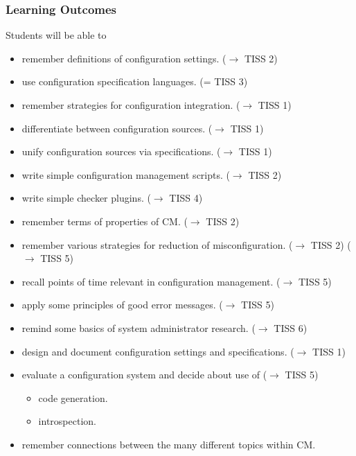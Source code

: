 \begin{frame}
	\footnotesize
	\frametitle{Learning Outcomes}
	Students will be able to

	\begin{itemize}
	\item remember definitions of configuration settings.
	($\rightarrow$ TISS 2)

	\item use configuration specification languages.
	(= TISS 3)

	\item remember strategies for configuration integration.
	($\rightarrow$ TISS 1)

	\item differentiate between configuration sources.
	($\rightarrow$ TISS 1)
	\item unify configuration sources via specifications.
	($\rightarrow$ TISS 1)

	\item {\color{gray} write simple configuration management scripts.}
	($\rightarrow$ TISS 2)

	\item {\color{gray} write simple checker plugins.}
	($\rightarrow$ TISS 4)

	\item remember terms of properties of CM.
	($\rightarrow$ TISS 2)
	\item remember various strategies for reduction of misconfiguration.
	($\rightarrow$ TISS 2)
	($\rightarrow$ TISS 5)

	\item recall points of time relevant in configuration management.
	($\rightarrow$ TISS 5)

	\item apply some principles of good error messages.
	($\rightarrow$ TISS 5)
	\item remind some basics of system administrator research.
	($\rightarrow$ TISS 6)

	\item design and document configuration settings and specifications.
	($\rightarrow$ TISS 1)
	\item evaluate a configuration system and decide about use of
	($\rightarrow$ TISS 5)
	\begin{itemize}
	\tiny
	\item code generation.
	\item introspection.
	\end{itemize}

	\item remember connections between the many different topics within CM.
	\end{itemize}
\end{frame}

